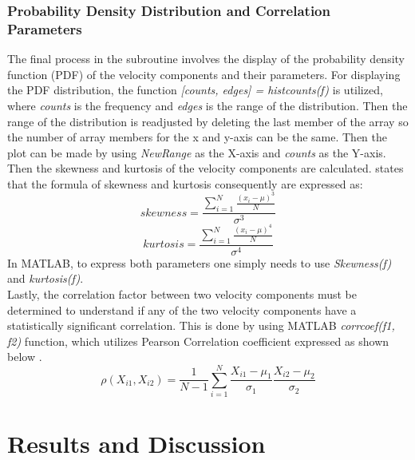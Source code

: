 \documentclass[11pt]{article}
\begin{document}
\subsubsection{Probability Density Distribution and Correlation Parameters}
\label{sc: Ndist}
The final process in the subroutine involves the display of the probability density function (PDF) of the velocity components and their parameters. For displaying the PDF distribution, the function \textit{[counts, edges] = histcounts(f)} is utilized, where \textit{counts} is the frequency and \textit{edges} is the range of the distribution. Then the range of the distribution is readjusted by deleting the last member of the array so the number of array members for the x and y-axis can be the same.
Then the plot can be made by using \textit{NewRange} as the X-axis and \textit{counts} as the Y-axis.\\
\newline
\noindent Then the skewness and kurtosis of the velocity components are calculated. \citet{NIST2023} states that the formula of skewness and kurtosis consequently are expressed as:
\begin{equation}
    skewness = \frac{\sum^N_{i=1}{\frac{(x_i-\mu)^3}{N}}}{\sigma^3}
\end{equation}
\begin{equation}
    kurtosis = \frac{\sum^N_{i=1}{\frac{(x_i-\mu)^4}{N}}}{\sigma^4}
\end{equation}
In MATLAB, to express both parameters one simply needs to use \textit{Skewness(f)} and \textit{kurtosis(f)}.\\
\newline
\noindent Lastly, the correlation factor between two velocity components must be determined to understand if any of the two velocity components have a statistically significant correlation. This is done by using MATLAB \textit{corrcoef(f1, f2)} function, which utilizes Pearson Correlation coefficient expressed as shown below \citep{MATLAB2023}.
\begin{equation}
    \rho(X_{i1}, X_{i2}) = \frac{1}{N-1} \sum^N_{i=1} {\frac{X_{i1}-\mu_1}{\sigma_1} \frac{X_{i2}-\mu_2}{\sigma_2}}
\end{equation}




\section{Results and Discussion}
\end{document}
